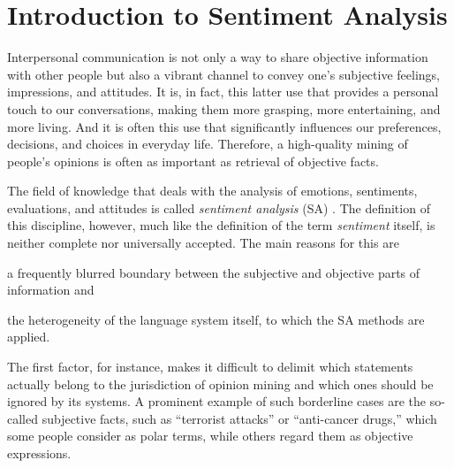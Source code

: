 


\chapter{Introduction to Sentiment Analysis}\label{chap:introduction}

Interpersonal communication is not only a way to share objective
information with other people but also a vibrant channel to convey
one's subjective feelings, impressions, and attitudes.  It is, in
fact, this latter use that provides a personal touch to our
conversations, making them more grasping, more entertaining, and more
living.  And it is often this use that significantly influences our
preferences, decisions, and choices in everyday life.  Therefore, a
high-quality mining of people's opinions is often as important as
retrieval of objective facts.

The field of knowledge that deals with the analysis of emotions,
sentiments, evaluations, and attitudes is called \emph{sentiment
  analysis} (SA) \citep{Liu:12}.  The definition of this discipline,
however, much like the definition of the term \emph{sentiment} itself,
is neither complete nor universally accepted.  The main reasons for
this are
\begin{inparaenum}[(i)]
  \item a frequently blurred boundary between the subjective and
    objective parts of information and
  \item the heterogeneity of the language system itself, to which the
    SA methods are applied.
\end{inparaenum}

The first factor, for instance, makes it difficult to delimit which
statements actually belong to the jurisdiction of opinion mining and
which ones should be ignored by its systems.  A prominent example of
such borderline cases are the so-called subjective facts, such as
``terrorist attacks'' or ``anti-cancer drugs,'' which some people
consider as polar terms, while others regard them as objective
expressions.

